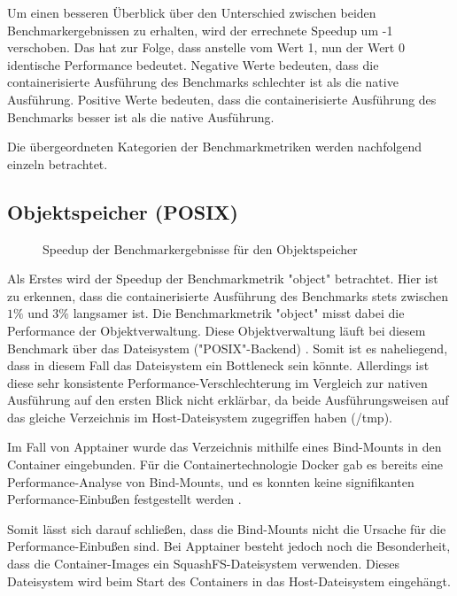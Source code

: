 Um einen besseren Überblick über den Unterschied zwischen beiden Benchmarkergebnissen zu erhalten, wird der errechnete Speedup um -1 verschoben. Das hat zur Folge, dass anstelle vom Wert 1, nun der Wert 0 identische Performance bedeutet. 
Negative Werte bedeuten, dass die containerisierte Ausführung des Benchmarks schlechter ist als die native Ausführung. Positive Werte bedeuten, dass die containerisierte Ausführung des Benchmarks besser ist als die native Ausführung. 

Die übergeordneten Kategorien der Benchmarkmetriken werden nachfolgend einzeln betrachtet.

\subsection{Objektspeicher (POSIX)} \label{sec:object-speedup}

\begin{figure}[H]
    \centering
    
    \caption{Speedup der Benchmarkergebnisse für den Objektspeicher}
    \label{fig:speedup_object}
\end{figure}

\FloatBarrier

Als Erstes wird der Speedup der Benchmarkmetrik "object" betrachtet. Hier ist zu erkennen, dass die containerisierte Ausführung des Benchmarks stets zwischen $1\%$ und $3\%$ langsamer ist. Die Benchmarkmetrik "object" misst dabei die Performance der Objektverwaltung. Diese Objektverwaltung läuft bei diesem Benchmark über das Dateisystem ("POSIX"-Backend) \cite[Vgl. S. 719]{kuhnJULEAFlexibleStorage2017}. Somit ist es naheliegend, dass in diesem Fall das Dateisystem ein Bottleneck sein könnte. Allerdings ist diese sehr konsistente Performance-Verschlechterung im Vergleich zur nativen Ausführung auf den ersten Blick nicht erklärbar, da beide Ausführungsweisen auf das gleiche Verzeichnis im Host-Dateisystem zugegriffen haben (/tmp). 

Im Fall von Apptainer wurde das Verzeichnis mithilfe eines Bind-Mounts in den Container eingebunden. Für die Containertechnologie Docker gab es bereits eine Performance-Analyse von Bind-Mounts, und es konnten keine signifikanten Performance-Einbußen festgestellt werden \cite[Vgl. 4]{dordevicFileSystemPerformance2022}. 

Somit lässt sich darauf schließen, dass die Bind-Mounts nicht die Ursache für die Performance-Einbußen sind. Bei Apptainer besteht jedoch noch die Besonderheit, dass die Container-Images ein SquashFS-Dateisystem verwenden. Dieses Dateisystem wird beim Start des Containers in das Host-Dateisystem eingehängt. 

